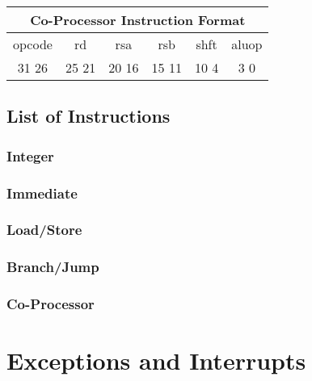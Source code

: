\documentclass[letterpaper, 11pt]{article}
\begin{document}
\begin{center}
		\begin{tabular}{|c|c|c|c|c|c|}
				\multicolumn{6}{c}{Co-Processor Instruction Format}\\ \hline
				\hspace{2pt} opcode \hspace{2pt} & \hspace{5pt} rd \hspace{5pt} &  \hspace{4pt} rsa \hspace{4pt} & \hspace{4pt}rsb  \hspace{4pt}& \hspace{10pt}shft  \hspace{10pt} & \hspace{3pt} aluop \hspace{3pt}   \\	\hline
			31 \hfill 26& 25 \hfill 21 &20 \hfill  16& 15 \hfill  11&10 \hfill   4&3 \hfill   0\\ \hline
		
	\end{tabular}
\end{center}	
\subsection{List of Instructions}
\subsubsection{Integer}
\subsubsection{Immediate}
\subsubsection{Load/Store}
\subsubsection{Branch/Jump}
\subsubsection{Co-Processor}



\section{Exceptions and Interrupts}
\end{document}
